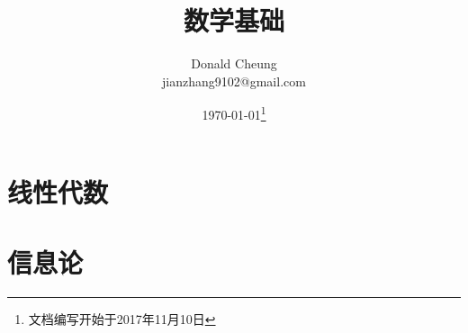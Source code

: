 \def\mathnotes{}
\ifx\notes\undefined
    \providecommand{\notesroot}{..}
    \providecommand{\mathroot}{.}

    \title{数学基础}
    \author{Donald Cheung\\jianzhang9102@gmail.com}
    \date{\today\footnote{文档编写开始于2017年11月10日}}

    
\else
    \providecommand{\mathroot}{\notesroot/math}
\fi



\chapter{线性代数}



\chapter{信息论}

\ifx\notes\undefined
    
\fi
